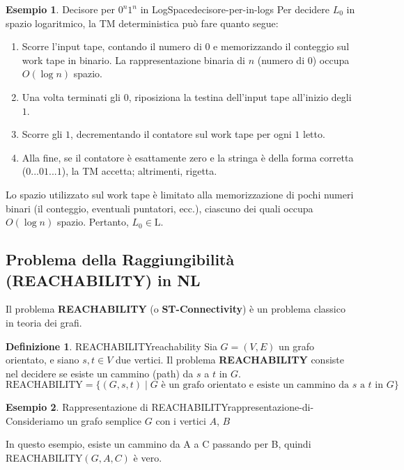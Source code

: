 \documentclass[a4paper]{article}
\theoremstyle{definition} %
\newtheorem{definition}{Definizione}[section]
\newtheorem{example}{Esempio}[section]
\begin{document}
\begin{example}{Decisore per $0^n1^n$ in LogSpace}{decisore-per-in-logs}
Per decidere $L_0$ in spazio logaritmico, la TM deterministica può fare quanto segue:
\begin{enumerate}
    \item Scorre l'input tape, contando il numero di $0$ e memorizzando il conteggio sul work tape in binario. La rappresentazione binaria di $n$ (numero di $0$) occupa $O(\log n)$ spazio.
    \item Una volta terminati gli $0$, riposiziona la testina dell'input tape all'inizio degli $1$.
    \item Scorre gli $1$, decrementando il contatore sul work tape per ogni $1$ letto.
    \item Alla fine, se il contatore è esattamente zero e la stringa è della forma corretta ($0...01...1$), la TM accetta; altrimenti, rigetta.
\end{enumerate}
Lo spazio utilizzato sul work tape è limitato alla memorizzazione di pochi numeri binari (il conteggio, eventuali puntatori, ecc.), ciascuno dei quali occupa $O(\log n)$ spazio. Pertanto, $L_0 \in \text{L}$.
\end{example}

\subsection{Problema della Raggiungibilità (REACHABILITY) in NL}

Il problema \textbf{REACHABILITY} (o \textbf{ST-Connectivity}) è un problema classico in teoria dei grafi.

\begin{definition}{REACHABILITY}{reachability}
Sia $G=(V,E)$ un grafo orientato, e siano $s, t \in V$ due vertici. Il problema \textbf{REACHABILITY} consiste nel decidere se esiste un cammino (path) da $s$ a $t$ in $G$.
\[ \text{REACHABILITY} = \{ (G, s, t) \mid G \text{ è un grafo orientato e esiste un cammino da } s \text{ a } t \text{ in } G \} \]
\end{definition}

\begin{example}{Rappresentazione di REACHABILITY}{rappresentazione-di-}
Consideriamo un grafo semplice $G$ con i vertici $A$, $B$
\begin{center}
\end{center}

\noindent
In questo esempio, esiste un cammino da A a C passando per B, quindi REACHABILITY$(G, A, C)$ è vero.
\end{example}
\end{document}
